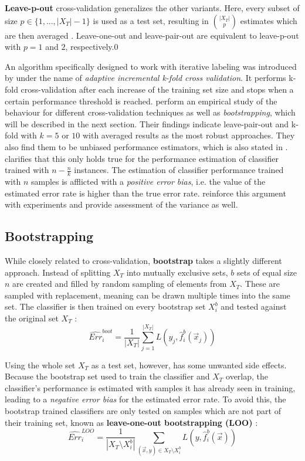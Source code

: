 \textbf{Leave-p-out} cross-validation generalizes the other variants. Here, every subset of size $p \in \{1, ..., |X_T|-1\}$ is used as a test set, resulting in $|X_T| \choose p$ estimates which are then averaged \cite{ArlotEtAl2010}. Leave-one-out and leave-pair-out are equivalent to leave-p-out with $p = 1$ and $2$, respectively.0

An algorithm specifically designed to work with iterative labeling was introduced by \cite{BrumenEtal2004} under the name of \textit{adaptive incremental k-fold cross validation}. It performs k-fold cross-validation after each increase of the training set size and stops when a certain performance threshold is reached. \cite{AirolaEtAl2001} perform an empirical study of the behaviour for different cross-validation techniques as well as \textit{bootstrapping}, which will be described in the next section. Their findings indicate leave-pair-out and k-fold with $k = 5$ or $10$ with averaged results as the most robust approaches. They also find them to be unbiased performance estimators, which is also stated in \cite{Kohavi1995}. \cite{RodriguezEtAl2013} clarifies that this only holds true for the performance estimation of classifier trained with $n - \frac{n}{k}$ instances. The estimation of classifier performance trained with $n$ samples is afflicted with a \textit{positive error bias}, i.e. the value of the estimated error rate is higher than the true error rate. \cite{EfronEtAl1997}  reinforce this argument with experiments and provide assessment of the variance as well.

\subsection{Bootstrapping}
While closely related to cross-validation, \textbf{bootstrap} takes a slightly different approach. Instead of splitting $X_T$ into mutually exclusive sets, $b$ sets of equal size $n$ are created and filled by random sampling of elements from $X_T$. These are sampled with replacement, meaning can be drawn multiple times into the same set. The classifier is then trained on every bootstrap set $X^b_i$ and tested against the original set $X_T$ \cite{Kohavi1995}:
\begin{equation}
\widehat{Err}^{boot}_i = \frac{1}{|X_T|} \sum_{j=1}^{|X_T|} L(y_j, \hat{f}^b_i(\vec{x}_j))
\end{equation}

Using the whole set $X_T$ as a test set, however, has some unwanted side effects. Because the bootstrap set used to train the classifier and $X_T$ overlap, the classifier's performance is estimated with samples it has already seen in training, leading to a \textit{negative error bias} for the estimated error rate. To avoid this, the bootstrap trained classifiers are only tested on samples which are not part of their training set, known as \textbf{leave-one-out bootstrapping (LOO)} \cite{BorraEtAl2010}:
\begin{equation}
\widehat{Err}^{LOO}_i = \frac{1}{|X_T \setminus X^b_i|} \sum_{(\vec{x}, y) \in X_T \setminus X^b_i}^{} L(y, \hat{f}^b_i(\vec{x}))
\end{equation}


